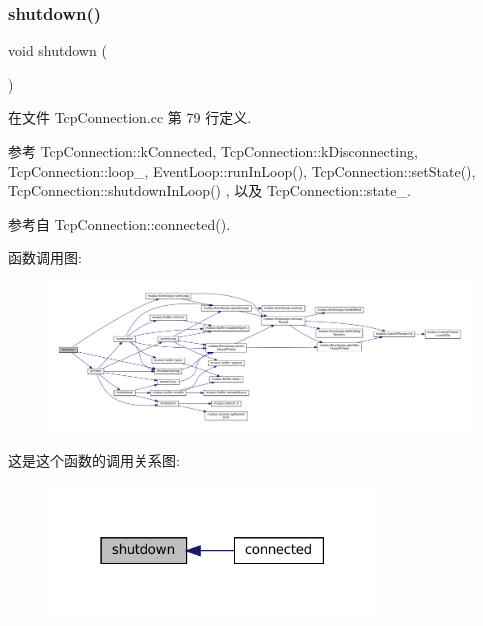 \subsubsection{\texorpdfstring{shutdown()}{shutdown()}}
{\footnotesize\ttfamily void shutdown (\begin{DoxyParamCaption}{ }\end{DoxyParamCaption})}



在文件 Tcp\+Connection.\+cc 第 79 行定义.



参考 Tcp\+Connection\+::k\+Connected, Tcp\+Connection\+::k\+Disconnecting, Tcp\+Connection\+::loop\+\_\+, Event\+Loop\+::run\+In\+Loop(), Tcp\+Connection\+::set\+State(), Tcp\+Connection\+::shutdown\+In\+Loop() , 以及 Tcp\+Connection\+::state\+\_\+.



参考自 Tcp\+Connection\+::connected().

函数调用图\+:
\nopagebreak
\begin{figure}[H]
\begin{center}
\leavevmode
\includegraphics[width=350pt]{classmuduo_1_1TcpConnection_a7861ee1569802186a619778efc85af13_cgraph}
\end{center}
\end{figure}
这是这个函数的调用关系图\+:
\nopagebreak
\begin{figure}[H]
\begin{center}
\leavevmode
\includegraphics[width=247pt]{classmuduo_1_1TcpConnection_a7861ee1569802186a619778efc85af13_icgraph}
\end{center}
\end{figure}
\mbox{\label{classmuduo_1_1TcpConnection_a4f988229386dc4e5f80cca96e096e074}} 
